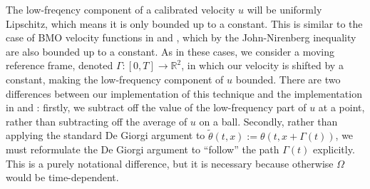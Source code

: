 \documentclass[11pt]{amsart}
\theoremstyle{remark}
\theoremstyle{definition}
\newcommand{\R}{\mathbb{R}}
\begin{document}
The low-freqency component of a calibrated velocity $u$ will be uniformly Lipschitz, which means it is only bounded up to a constant.  This is similar to the case of BMO velocity functions in \cite{CaVa.sqg} and \cite{NoVa.qg}, which by the John-Nirenberg inequality are also bounded up to a constant.  As in these cases, we consider a moving reference frame, denoted $\Gamma:[0,T] \to \R^2$, in which our velocity is shifted by a constant, making the low-frequency component of $u$ bounded. There are two differences between our implementation of this technique and the implementation in \cite{CaVa.sqg} and \cite{NoVa.qg}: firstly, we subtract off the value of the low-frequency part of $u$ at a point, rather than subtracting off the average of $u$ on a ball.  Secondly, rather than applying the standard De Giorgi argument to $\tilde{\theta}(t,x) := \theta(t,x+\Gamma(t))$, we must reformulate the De Giorgi argument to ``follow'' the path $\Gamma(t)$ explicitly.  This is a purely notational difference, but it is necessary because otherwise $\Omega$ would be time-dependent.  
%
\end{document}
